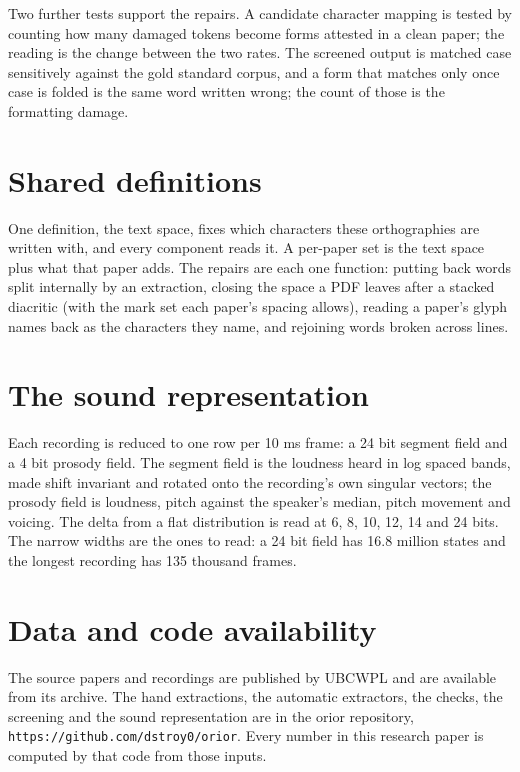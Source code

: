 Two further tests support the repairs. A candidate character mapping is tested by counting how many
damaged tokens become forms attested in a clean paper; the reading is the change between the two
rates. The screened output is matched case sensitively against the gold standard corpus, and a form
that matches only once case is folded is the same word written wrong; the count of those is the
formatting damage.

\section{Shared definitions}

One definition, the text space, fixes which characters these orthographies are written with, and
every component reads it. A per-paper set is the text space plus what that paper adds. The
repairs are each one function: putting back words split internally by an extraction, closing the
space a PDF leaves after a stacked diacritic (with the mark set each paper's spacing allows), reading
a paper's glyph names back as the characters they name, and rejoining words broken across lines.

\section{The sound representation}

Each recording is reduced to one row per 10 ms frame: a 24 bit segment field and a 4 bit prosody
field. The segment field is the loudness heard in log spaced bands, made shift invariant and rotated
onto the recording's own singular vectors; the prosody field is loudness, pitch against the
speaker's median, pitch movement and voicing. The delta from a flat distribution is read at 6, 8,
10, 12, 14 and 24 bits. The narrow widths are the ones to read: a 24 bit field has 16.8 million
states and the longest recording has 135 thousand frames.

\section{Data and code availability}

The source papers and recordings are published by UBCWPL and are available from its archive. The
hand extractions, the automatic extractors, the checks, the screening and the sound representation
are in the orior repository, \texttt{https://github.com/dstroy0/orior}. Every number in this research paper
is computed by that code from those inputs.

